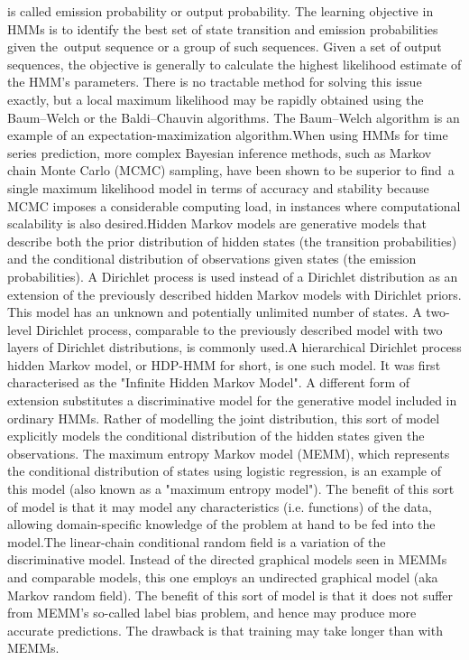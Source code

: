 {{{is called emission probability or output probability.
The learning objective in HMMs is to identify the best set of state transition and emission probabilities given the output sequence or a group of such sequences. Given a set of output sequences, the objective is generally to calculate the highest likelihood estimate of the HMM's parameters. There is no tractable method for solving this issue exactly, but a local maximum likelihood may be rapidly obtained using the Baum–Welch or the Baldi–Chauvin algorithms. The Baum–Welch algorithm is an example of an expectation-maximization algorithm.When using HMMs for time series prediction, more complex Bayesian inference methods, such as Markov chain Monte Carlo (MCMC) sampling, have been shown to be superior to find a single maximum likelihood model in terms of accuracy and stability because MCMC imposes a considerable computing load, in instances where computational scalability is also desired.Hidden Markov models are generative models that describe both the prior distribution of hidden states (the transition probabilities) and the conditional distribution of observations given states (the emission probabilities). A Dirichlet process is used instead of a Dirichlet distribution as an extension of the previously described hidden Markov models with Dirichlet priors. This model has an unknown and potentially unlimited number of states. A two-level Dirichlet process, comparable to the previously described model with two layers of Dirichlet distributions, is commonly used.A hierarchical Dirichlet process hidden Markov model, or HDP-HMM for short, is one such model. It was first characterised as the "Infinite Hidden Markov Model". A different form of extension substitutes a discriminative model for the generative model included in ordinary HMMs. Rather of modelling the joint distribution, this sort of model explicitly models the conditional distribution of the hidden states given the observations. The maximum entropy Markov model (MEMM), which represents the conditional distribution of states using logistic regression, is an example of this model (also known as a "maximum entropy model"). The benefit of this sort of model is that it may model any characteristics (i.e. functions) of the data, allowing domain-specific knowledge of the problem at hand to be fed into the model.The linear-chain conditional random field is a variation of the discriminative model. Instead of the directed graphical models seen in MEMMs and comparable models, this one employs an undirected graphical model (aka Markov random field). The benefit of this sort of model is that it does not suffer from MEMM's so-called label bias problem, and hence may produce more accurate predictions. The drawback is that training may take longer than with MEMMs.
}}}
